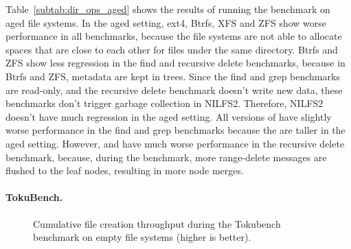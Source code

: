 Table~\ref{subtab:dir_ops_aged} shows the results of running the benchmark on
aged file systems.
In the aged setting, ext4, Btrfs, XFS and ZFS show worse performance in
all benchmarks,
because the file systems are not able to allocate
spaces that are close to each other for files under the same directory.
Btrfs and ZFS show less regression in the find and recursive delete benchmarks,
because in Btrfs and ZFS, metadata are kept in trees.
Since the find and grep benchmarks are read-only,
and the recursive delete benchmark doesn't write new data,
these benchmarks don't trigger garbage collection in NILFS2.
Therefore, NILFS2 doesn't have much regression in the aged setting.
All versions of \betrfs have slightly worse performance in the
find and grep benchmarks because the \bets are taller in the aged setting.
However, \betrfsThree and \betrfsFour have much worse performance in the
recursive delete benchmark,
because, during the benchmark, more range-delete messages are flushed
to the leaf nodes, resulting in more node merges.

\paragraph{TokuBench.}

\begin{figure}[t]
    \centering
    \caption[TokuBench benchmark on empty file systems]{\label{fig:toku_empty}
        Cumulative file creation throughput during the Tokubench benchmark on empty file systems (higher is better).}
\end{figure}

